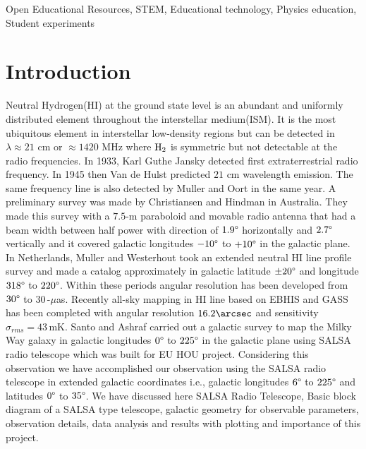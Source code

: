 \documentclass[10pt,conference]{IEEEtran}
\begin{document}
\begin{IEEEkeywords}
Open Educational Resources, STEM, Educational technology, Physics education, Student experiments
\end{IEEEkeywords}

\section{Introduction}
Neutral Hydrogen(HI) at the ground state level is an abundant and uniformly distributed element throughout the interstellar medium(ISM). It is the most ubiquitous element in interstellar  low-density regions but can be detected in $\lambda\approx21$ cm or $\approx1420$ MHz where $\textnormal{H}_2$ is symmetric but not detectable at the radio frequencies\cite{HI2016}. In 1933, Karl Guthe Jansky detected first extraterrestrial radio frequency\cite{jansky1933radio}. In 1945 then Van de Hulst predicted $21$ cm wavelength emission\cite{CJBakker1945}. The same frequency line is also detected by Muller and Oort\cite{muller1951observation} in the same year. A preliminary survey was made by Christiansen and Hindman\cite{christiansen1952preliminary} in Australia. They made this survey with a $7.5$\textnormal{-m} paraboloid and movable radio antenna that had a beam width between half power with direction of $1.9\degree$ horizontally and $2.7\degree$ vertically and it covered galactic longitudes $-10\degree$ to $+10\degree$ in the galactic plane. In Netherlands, Muller and Westerhout\cite{Muller1957} took an extended neutral HI line profile survey and made a catalog approximately in galactic latitude $\pm20\degree$ and longitude $318\degree$ to $220\degree$. Within these periods angular resolution has been developed from $30\degree$ to $30$\,-$\mu$as\cite{kellermann2001development,Middelberg2008}. Recently all-sky mapping in HI line based on EBHIS and GASS has been completed\cite{bekhti2016hi4pi} with angular resolution $16.2\arcsec$ and sensitivity $\sigma_{rms}=43$\,mK. Santo and Ashraf carried out a galactic survey to map the Milky Way galaxy in galactic longitudes $0\degree$ to $225\degree$ in the galactic plane\cite{santo2013mapping} using SALSA radio telescope which was built for EU HOU project\cite{Doran2007}. Considering this observation we have accomplished our observation using the SALSA radio telescope in extended galactic coordinates i.e., galactic longitudes $6\degree$ to $225\degree$ and latitudes $0\degree$ to $35\degree$. We have discussed here SALSA Radio Telescope, Basic block diagram of a SALSA type telescope, galactic geometry for observable parameters, observation details, data analysis and results with plotting and importance of this project.
\end{document}
